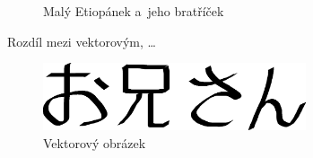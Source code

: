 \documentclass[a4paper,11pt]{article}
\begin{document}
\begin{figure}[h]
{}
\caption{Malý Etiopánek a~jeho bratříček}
\label{obrazek_1}
\end{figure}

\bigskip

\newpage

Rozdíl mezi vektorovým, \dots

\begin{figure}[h]
\centering
\includegraphics[width=220pt]{oniisan.eps}	
\caption{Vektorový obrázek}
\label{obrazek_2}
\end{figure}
\end{document}

